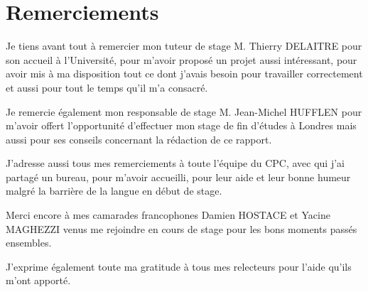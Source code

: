 \chapter*{Remerciements}

Je tiens avant tout \`a remercier mon tuteur de stage M. Thierry DELAITRE pour son accueil \`a l'Universit\'e, pour m'avoir propos\'e un projet aussi int\'eressant, pour avoir mis \`a ma disposition tout ce dont j'avais besoin pour travailler correctement et aussi pour tout le temps qu'il m'a consacr\'e.

Je remercie \'egalement mon responsable de stage M. Jean-Michel HUFFLEN pour m'avoir offert l'opportunit\'e d'effectuer mon stage de fin d'\'etudes \`a Londres mais aussi pour ses conseils concernant la r\'edaction de ce rapport.

J'adresse aussi tous mes remerciements \`a toute l'\'equipe du CPC, avec qui j'ai partag\'e un bureau, pour m'avoir accueilli, pour leur aide et leur bonne humeur malgr\'e la barri\`ere de la langue en d\'ebut de stage.

Merci encore \`a mes camarades francophones Damien HOSTACE et Yacine MAGHEZZI venus me rejoindre en cours de stage pour les bons moments pass\'es ensembles.

J'exprime \'egalement toute ma gratitude \`a tous mes relecteurs pour l'aide qu'ils m'ont apport\'e.

\clearpage

